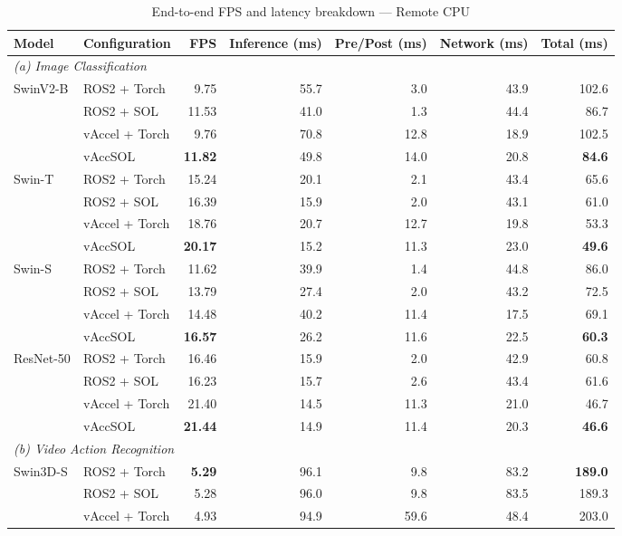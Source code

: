 \begin{table}[t]
\centering
\caption{End-to-end FPS and latency breakdown --- Remote CPU}
\label{tab:e2e-remote-cpu}
\small
\begin{tabular}{llrrrrr}
\toprule
Model & Configuration & FPS & Inference (ms) & Pre/Post (ms) & Network (ms) & Total (ms) \\
\midrule
\multicolumn{7}{l}{\textit{(a) Image Classification}} \\
\midrule
\multirow{4}{*}{SwinV2-B} & ROS2 + Torch & 9.75 & 55.7 & 3.0 & 43.9 & 102.6 \\
 & ROS2 + SOL & 11.53 & 41.0 & 1.3 & 44.4 & 86.7 \\
 & vAccel + Torch & 9.76 & 70.8 & 12.8 & 18.9 & 102.5 \\
 & vAccSOL & \textbf{11.82} & 49.8 & 14.0 & 20.8 & \textbf{84.6} \\
\cmidrule(lr){1-7}
\multirow{4}{*}{Swin-T} & ROS2 + Torch & 15.24 & 20.1 & 2.1 & 43.4 & 65.6 \\
 & ROS2 + SOL & 16.39 & 15.9 & 2.0 & 43.1 & 61.0 \\
 & vAccel + Torch & 18.76 & 20.7 & 12.7 & 19.8 & 53.3 \\
 & vAccSOL & \textbf{20.17} & 15.2 & 11.3 & 23.0 & \textbf{49.6} \\
\cmidrule(lr){1-7}
\multirow{4}{*}{Swin-S} & ROS2 + Torch & 11.62 & 39.9 & 1.4 & 44.8 & 86.0 \\
 & ROS2 + SOL & 13.79 & 27.4 & 2.0 & 43.2 & 72.5 \\
 & vAccel + Torch & 14.48 & 40.2 & 11.4 & 17.5 & 69.1 \\
 & vAccSOL & \textbf{16.57} & 26.2 & 11.6 & 22.5 & \textbf{60.3} \\
\cmidrule(lr){1-7}
\multirow{4}{*}{ResNet-50} & ROS2 + Torch & 16.46 & 15.9 & 2.0 & 42.9 & 60.8 \\
 & ROS2 + SOL & 16.23 & 15.7 & 2.6 & 43.4 & 61.6 \\
 & vAccel + Torch & 21.40 & 14.5 & 11.3 & 21.0 & 46.7 \\
 & vAccSOL & \textbf{21.44} & 14.9 & 11.4 & 20.3 & \textbf{46.6} \\
\cmidrule(lr){1-7}
\midrule
\multicolumn{7}{l}{\textit{(b) Video Action Recognition}} \\
\midrule
\multirow{4}{*}{Swin3D-S} & ROS2 + Torch & \textbf{5.29} & 96.1 & 9.8 & 83.2 & \textbf{189.0} \\
 & ROS2 + SOL & 5.28 & 96.0 & 9.8 & 83.5 & 189.3 \\
 & vAccel + Torch & 4.93 & 94.9 & 59.6 & 48.4 & 203.0 \\

\end{tabular}
\end{table}
